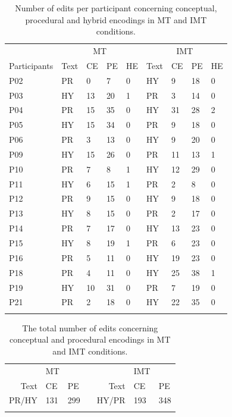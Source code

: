 \documentclass[output=paper]{langsci/langscibook}
\begin{document}
\begin{table}
\begin{tabular}{lllllllll}
\lsptoprule 
& \multicolumn{4}{c}{MT} & \multicolumn{4}{c}{IMT} \\
Participants & Text & CE & PE & HE & Text & CE & PE & HE \\
\midrule
P02 & PR & 0 & 7 & 0  & HY & 9 & 18 & 0\\
P03 & HY & 13 & 20 & 1  & PR & 3 & 14 & 0\\
P04 & PR & 15 & 35 & 0  & HY & 31 & 28 & 2\\
P05 & HY & 15 & 34 & 0  & PR & 9 & 18 & 0\\
P06 & PR & 3 & 13 & 0  & HY & 9 & 20 & 0\\
P09 & HY & 15 & 26 & 0  & PR & 11 & 13 & 1\\
P10 & PR & 7 & 8 & 1  & HY & 12 & 29 & 0\\
P11 & HY & 6 & 15 & 1  & PR & 2 & 8 & 0\\
P12 & PR & 9 & 15 & 0  & HY & 9 & 18 & 0\\
P13 & HY & 8 & 15 & 0  & PR & 2 & 17 & 0\\
P14 & PR & 7 & 17 & 0  & HY & 13 & 23 & 0\\
P15 & HY & 8 & 19 & 1  & PR & 6 & 23 & 0\\
P16 & PR & 5 & 11 & 0  & HY & 19 & 23 & 0\\
P18 & PR & 4 & 11 & 0  & HY & 25 & 38 & 1\\
P19 & HY & 10 & 31 & 0  & PR & 7 & 19 & 0\\
P21 & PR & 2 & 18 & 0  & HY & 22 & 35 & 0\\
\lspbottomrule
\end{tabular}
\caption{Number of edits per participant concerning conceptual, procedural and hybrid encodings in MT and IMT conditions.}
\label{sarto:tab:1}
\end{table}

\begin{table}
\begin{tabular}{rllcrll}
\lsptoprule
{~} & {MT} & ~ && {~} & {IMT} & ~\\
Text & CE & PE && Text & CE & PE\\
\midrule
PR/HY & 131 & 299 && HY/PR & 193 & 348\\
\lspbottomrule
\end{tabular}
\caption{The total number of edits concerning conceptual and procedural encodings in MT and IMT conditions.}
\label{sarto:tab:2}
\end{table}
\end{document}
